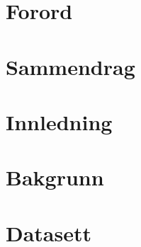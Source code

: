 \documentclass[norsk, a4paper, 12pt, twoside]{article}
\numberwithin{equation}{section} %
\begin{document}

\restoregeometry


\thispagestyle{plain} %
\clearpage\mbox{}\clearpage %

\newpage
\section*{Forord}
    

\newpage
\section*{Sammendrag}
    

\newpage
{ %
\tableofcontents
}

\newpage
\renewcommand{\listfigurename}{Figurliste}
{ %
\listoffigures}
 
\newpage
\renewcommand{\listtablename}{Tabelliste}
{ %
\listoftables}

\newpage
{} %
\setcounter{page}{1} %

\section{Innledning} %
\clearpage %

\section{Bakgrunn}
    
\clearpage

\section{Datasett}
    
\clearpage
\end{document}
